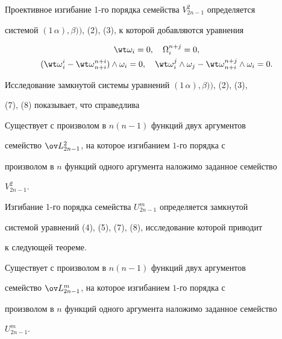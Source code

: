 Проективное изгибание 1-го порядка семейства $V^2_{2n-1}$ определяется 


системой $(1\,\alpha), \beta))$, (2), (3), к которой добавляются уравнения 


\begin{gather} 


\wt\omega_i=0,\quad \Omega^{n+j}_i=0,\\ 


%


(\wt\omega{}^i_i-\wt\omega{}^{n+i}_{n+i})\wedge\omega_i=0,\quad 


\wt\omega{}^j_i\wedge\omega_j-\wt\omega{}^{n+j}_{n+i} 


\wedge\omega_i=0. 


\end{gather} 


Исследование замкнутой системы уравнений $(1\,\alpha), \beta))$, (2), (3), 


(7), (8) показывает, что справедлива 


 


\begin{thm} 


Существует с произволом в $n(n-1)$ функций двух аргументов 


семейство $\ov L{}^2_{2n-1}$, на которое изгибанием $1$-го порядка с 


произволом в $n$ функций одного аргумента наложимо заданное семейство 


$V^2_{2n-1}$. 


\end{thm} 


 


Изгибание 1-го порядка семейства $U^m_{2n-1}$ определяется замкнутой 


системой уравнений (4), (5), (7), (8), исследование которой приводит


к следующей теореме.


 


\begin{thm} 


Существует с произволом в $n(n-1)$ функций двух аргументов 


семейство $\ov L{}^m_{2n-1}$, на которое изгибанием $1$-го порядка с 


произволом в $n$ функций одного аргумента наложимо заданное семейство 


$U^m_{2n-1}$. 


\end{thm} 


